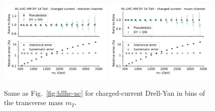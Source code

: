 \documentclass[withindex,glossary]{cam-thesis}
\begin{document}
\begin{figure}[t]
\begin{center}
  \includegraphics[width=0.49\textwidth]{dy_figures/HLLHC_HMDY_CC_EL_FINAL_plot_error_breakdown_0.pdf}
  \includegraphics[width=0.49\textwidth]{dy_figures/HLLHC_HMDY_CC_MU_FINAL_plot_error_breakdown_0.pdf}
    \caption{\label{fig:hllhc-cc} Same as Fig.~\ref{fig:hllhc-nc} for
      charged-current Drell-Yan in bins of the transverse mass $m_T$.
    }
\end{center}
\end{figure}
\end{document}
